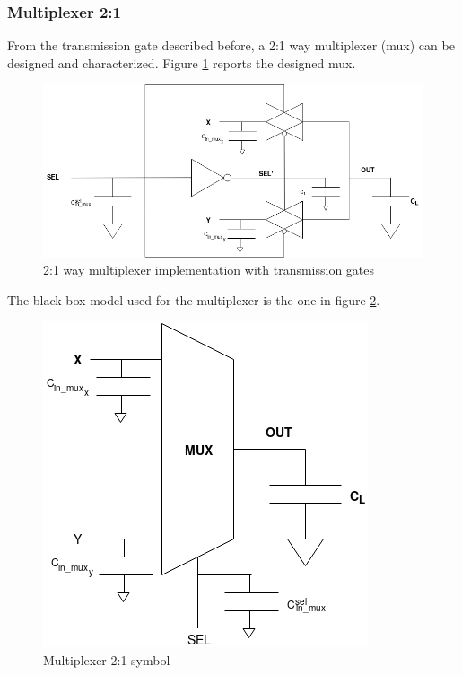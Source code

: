 \subsubsection{Multiplexer 2:1}
From the transmission gate described before, a 2:1 way multiplexer (mux) can be designed and characterized. Figure \ref{fig:2to1mux} reports the designed mux.

\begin{figure}[H]
\centering
\includegraphics[width = 11.5 cm, height = 6 cm]{pentium/mux2.png}
\caption{2:1 way multiplexer implementation with transmission gates}
\label{fig:2to1mux}
\end{figure}

The black-box model used for the multiplexer is the one in figure \ref{fig:mux_black_box}.

\begin{figure}[H]
\centering
\includegraphics[width = 8 cm, height = 7 cm]{pentium/mux_schematic.png}
\caption{Multiplexer 2:1 symbol}
\label{fig:mux_black_box}
\end{figure}


